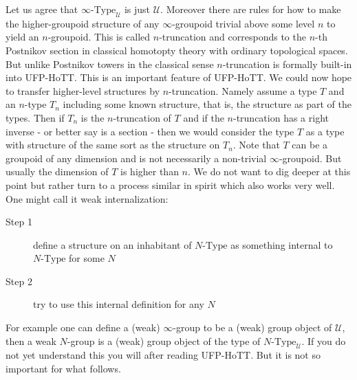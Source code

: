 Let us agree that $\infty\textrm{-Type}_{\mathcal{U}}$ is just $\mathcal{U}$. Moreover there are rules for how to make the higher-groupoid structure of any $\infty$-groupoid trivial above some level $n$ to yield an $n$-groupoid. This is called $n$-truncation and corresponds to the $n$-th Postnikov section in classical homotopty theory with ordinary topological spaces. But unlike Postnikov towers in the classical sense $n$-truncation is formally built-in into UFP-HoTT. This is an important feature of UFP-HoTT. We could now hope to transfer higher-level structures by $n$-truncation. Namely assume a type $T$ and an $n$-type $T_{n}$ including some known structure, that is, the structure as part of the types. Then if $T_{n}$ is the $n$-truncation of $T$ and if the $n$-truncation has a right inverse - or better say is a section - then we would consider the type $T$ as a type with structure of the same sort as the structure on $T_{n}$. Note that $T$ can be a groupoid of any dimension and is not necessarily a non-trivial $\infty$-groupoid. But usually the dimension of $T$ is higher than $n$. We do not want to dig deeper at this point but rather turn to a process similar in spirit which also works very well. One might call it weak internalization:
\begin{description}
\item[Step 1]
define a structure on an inhabitant of $N\textrm{-Type}$ as something internal to $N\textrm{-Type}$ for some $N$
\item[Step 2]
try to use this internal definition for any $N$
\end{description}
For example one can define a (weak) $\infty$-group to be a (weak) group object of $\mathcal{U}$, then a weak $N$-group is a (weak) group object of the type of $N\textrm{-Type}_{\mathcal{U}}$. If you do not yet understand this you will after reading UFP-HoTT. But it is not so important for what follows. 
\\
